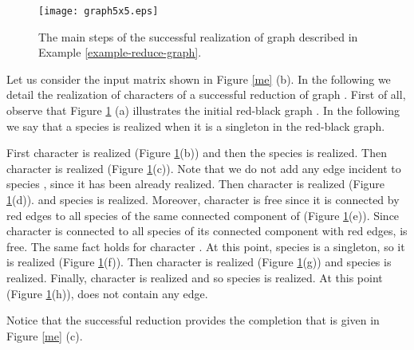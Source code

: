 \documentclass{llncs}
\newcommand{\grb}{ }
\newcommand{\grbd}{. }
\newcommand{\me}{{} }
\begin{document}
\begin{comment}
Let  be the root node of the tree.  Assign  to the root. Then let  be a new edge of the tree
\begin{itemize}

\item  label  with the character  that is realized  in a component  of the red-black graph
 and  if species  is realized then label node  with species . If  the component has still unrealized characters, then move  to . If the component is split into components , then for each of these components create edge  and apply recursively the procedure on each component graph  from the root node ,

\item if the negated character  is free then add a new edge  from node  labeled with
,


\end{itemize}

\end{comment}


\begin{figure}[ptb]
\begin{center}
\texttt{[image: graph5x5.eps]}
\end{center}
\caption{The main steps of the successful realization of  graph \grb   described in Example \ref{example-reduce-graph}.}
\label{graph}
\end{figure}

\begin{example}
\label{example-reduce-graph}
Let us consider the  input matrix \me shown in Figure \ref{me} (b). In the following we detail the realization of characters of a successful reduction    of graph \grbd
First of all, observe that  Figure \ref{graph} (a) illustrates the initial red-black graph \grbd In the following we say that a species is realized when it is a singleton in the red-black graph.

First character  is realized (Figure \ref{graph}(b)) and then  
the species  is realized. Then character  is realized (Figure \ref{graph}(c)). 
Note that we do not add any edge incident to species , since it has been already realized. 
Then character  is realized (Figure \ref{graph}(d)). 
and  species  is realized. Moreover, character  is free since it is connected by red edges to all species of the same connected component of  (Figure \ref{graph}(e)).  Since character  is connected to all species of its connected component with  red edges,  is free.
The same fact holds for character . At this point, species  is a singleton, so it is realized (Figure \ref{graph}(f)).
Then character  is realized (Figure \ref{graph}(g))  and species  is realized. 
 Finally,   character  is realized  and  so species  is realized. At this point (Figure \ref{graph}(h)), \grb does not contain any edge.

Notice that the successful reduction provides the completion that is given in Figure \ref{me} (c).

\end{example}
\end{document}
